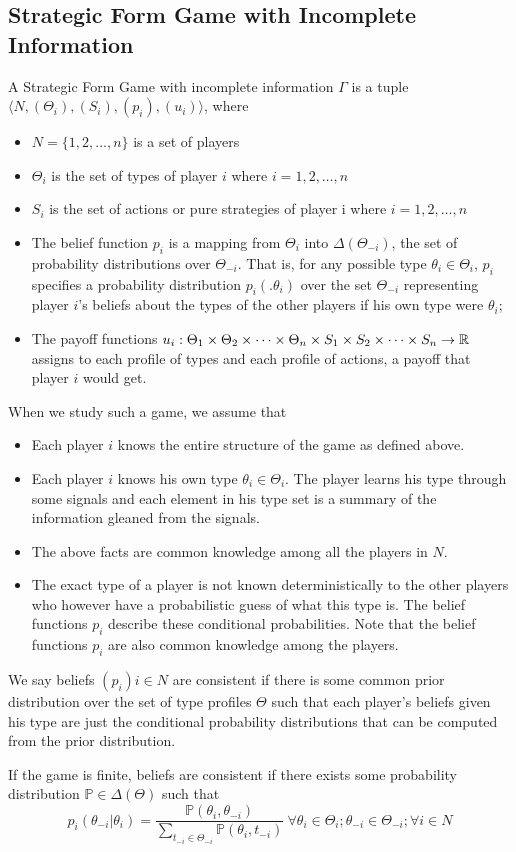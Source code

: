 \subsection{Strategic Form Game with Incomplete Information}
A Strategic Form Game with incomplete information $\Gamma$ is a tuple $\langle N,(\Theta_i),(S_i),(p_i),(u_i)\rangle$, where
\begin{itemize}
    \item $N=\{1,2,\ldots,n\}$ is a set of players
    \item $\Theta_i$ is the set of types of player $i$ where $i=1,2,\ldots,n$
    \item $S_i$ is the set of actions or pure strategies of player i where $i=1,2,\ldots,n$
    \item The belief function $p_i$ is a mapping from $\Theta_i$ into $\Delta(\Theta_{-i})$, the set of probability distributions over $\Theta_{-i}$.
    That is, for any possible type $\theta_i\in\Theta_{i}$, $p_i$ specifies a probability distribution $p_i(.
    \theta_i)$ over the set $\Theta_{-i}$ representing player $i$'s beliefs about the types of the other players if his own type were $\theta_i$;
    \item The payoff functions $u_i :\Theta_1 \times \Theta_2 \times \cdots \times \Theta_n \times S_1 \times S_2 \times \cdots \times S_n \rightarrow \mathbb{R}$ assigns to each profile of types and each profile of actions, a payoff that player $i$ would get.
\end{itemize}
When we study such a game, we assume that
\begin{itemize}
    \item Each player $i$ knows the entire structure of the game as defined above.
    \item Each player $i$ knows his own type $\theta_i\in\Theta_{i}$.
    The player learns his type through some signals and each element in his type set is a summary of the information gleaned from the signals.
    \item The above facts are common knowledge among all the players in $N$.
    \item The exact type of a player is not known deterministically to the other players who however have a probabilistic guess of what this type is.
    The belief functions $p_i$ describe these conditional probabilities.
    Note that the belief functions $p_i$ are also common knowledge among the players.
\end{itemize}
\begin{defn}
    We say beliefs $(p_i)i\in N$ are consistent if there is some common prior distribution over the set of type profiles $\Theta$ such that each player's beliefs given his type are just the conditional probability distributions that can be computed from the prior distribution.
\end{defn}
If the game is finite, beliefs are consistent if there exists some probability distribution $\mathbb{P} \in \Delta(\Theta)$ such that
\[p_i(\theta_{-i}|\theta_i)=\frac{{\mathbb{P}(\theta_i,\theta_{-i})}}{\sum_{t_{-i}\in\Theta_{-i}}{\mathbb{P}(\theta_i,t_{-i})}}\ \forall \theta_i\in\Theta_i; \theta_{-i}\in\Theta_{-i};\forall i\in N\]
